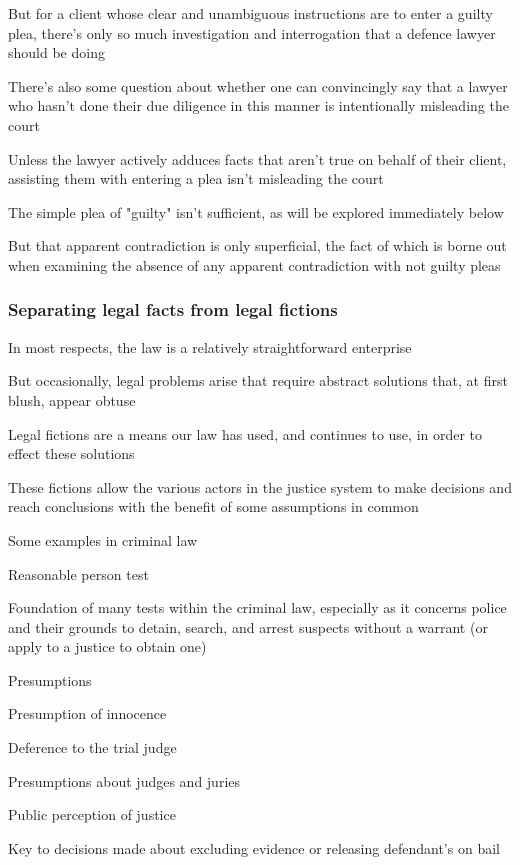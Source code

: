 But for a client whose clear and unambiguous instructions are to enter a guilty plea, there's only so much investigation and interrogation that a defence lawyer should be doing

There's also some question about whether one can convincingly say that a lawyer who hasn't done their due diligence in this manner is intentionally misleading the court

Unless the lawyer actively adduces facts that aren't true on behalf of their client, assisting them with entering a plea isn't misleading the court

The simple plea of "guilty" isn't sufficient, as will be explored immediately below

But that apparent contradiction is only superficial, the fact of which is borne out when examining the absence of any apparent contradiction with not guilty pleas

\subsubsection{Separating legal facts from legal fictions}

In most respects, the law is a relatively straightforward enterprise

But occasionally, legal problems arise that require abstract solutions that, at first blush, appear obtuse

Legal fictions are a means our law has used, and continues to use, in order to effect these solutions

These fictions allow the various actors in the justice system to make decisions and reach conclusions with the benefit of some assumptions in common

Some examples in criminal law

Reasonable person test

Foundation of many tests within the criminal law, especially as it concerns police and their grounds to detain, search, and arrest suspects without a warrant (or apply to a justice to obtain one)

Presumptions

Presumption of innocence

Deference to the trial judge

Presumptions about judges and juries

Public perception of justice

Key to decisions made about excluding evidence or releasing defendant's on bail

